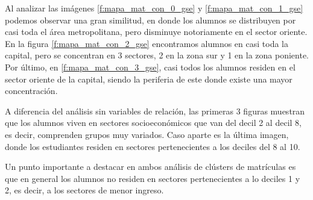 Al analizar las imágenes \ref{f:mapa_mat_con_0_gse} y \ref{f:mapa_mat_con_1_gse} podemos observar una gran similitud, en donde los alumnos se distribuyen por casi toda el área metropolitana, pero disminuye notoriamente en el sector oriente. En la figura \ref{f:mapa_mat_con_2_gse} encontramos alumnos en casi toda la capital, pero se concentran en 3 sectores,  2 en la zona sur y 1 en la zona poniente. Por último, en \ref{f:mapa_mat_con_3_gse}, casi todos los alumnos residen en el sector oriente de la capital, siendo la periferia de este donde existe una mayor concentración.

A diferencia del análisis sin variables de relación, las primeras 3 figuras muestran que los alumnos viven en sectores socioeconómicos que van del decil 2 al decil 8, es decir, comprenden grupos muy variados. Caso aparte es la última imagen, donde los estudiantes residen en sectores pertenecientes a los deciles del 8 al 10.

Un punto importante a destacar en ambos análisis de clústers de matrículas es que en general los alumnos no residen en sectores pertenecientes a lo deciles 1 y 2, es decir, a los sectores de menor ingreso.


